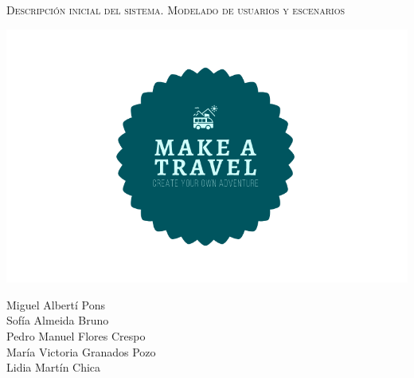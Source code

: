 \documentclass[11pt]{article}
\begin{document}
\begin{titlepage}
\centering
\vspace{4.5cm}
{\scshape\LARGE Descripción inicial del sistema. Modelado de usuarios y escenarios \par}
\vspace{1.5cm}

\includegraphics[width=16cm] {Logo}

\vspace{3cm}
{\scshape\large \par}
\vspace{1cm}

{Miguel Albertí Pons\\
Sofía Almeida Bruno\\
Pedro Manuel Flores Crespo\\
María Victoria Granados Pozo\\
Lidia Martín Chica
\par}

\end{titlepage}


\newpage
\end{document}
